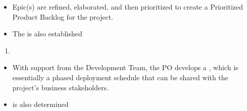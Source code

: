 \documentclass[letterpaper,10pt,english]{jupyterBook}
\begin{document}
\begin{itemize}
\item {} 
\sphinxAtStartPar
Epic(s) are refined, elaborated, and then prioritized to create a Prioritized Product Backlog for the project.

\item {} 
\sphinxAtStartPar
The  is also established

\end{itemize}
\begin{enumerate}
%
\setcounter{enumi}{5}
\item {} 
\sphinxAtStartPar
{}

\end{enumerate}
\begin{itemize}
\item {} 
\sphinxAtStartPar
With support from the Development Team, the PO develops a , which is essentially a phased deployment schedule that can be shared with the project’s business stakeholders.

\item {} 
\sphinxAtStartPar
{} is also determined

\end{itemize}
\end{document}
